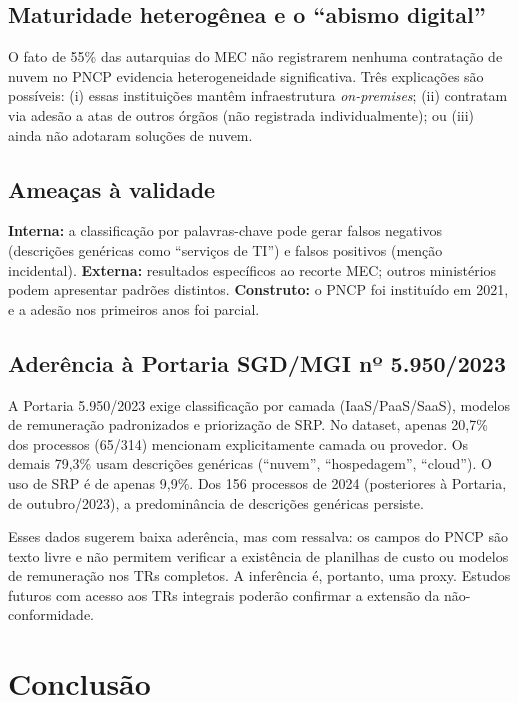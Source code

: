 \documentclass[12pt]{article}
\begin{document}
\subsection{Maturidade heterogênea e o ``abismo digital''}

O fato de 55\% das autarquias do MEC não registrarem nenhuma contratação de nuvem no PNCP evidencia heterogeneidade significativa. Três explicações são possíveis: (i) essas instituições mantêm infraestrutura \textit{on-premises}; (ii) contratam via adesão a atas de outros órgãos (não registrada individualmente); ou (iii) ainda não adotaram soluções de nuvem.

\subsection{Ameaças à validade}

\textbf{Interna:} a classificação por palavras-chave pode gerar falsos negativos (descrições genéricas como ``serviços de TI'') e falsos positivos (menção incidental). \textbf{Externa:} resultados específicos ao recorte MEC; outros ministérios podem apresentar padrões distintos. \textbf{Construto:} o PNCP foi instituído em 2021, e a adesão nos primeiros anos foi parcial.

\subsection{Aderência à Portaria SGD/MGI nº 5.950/2023}

A Portaria 5.950/2023 \cite{brasil2023portaria5950} exige classificação por camada (IaaS/PaaS/SaaS), modelos de remuneração padronizados e priorização de SRP. No dataset, apenas 20,7\% dos processos (65/314) mencionam explicitamente camada ou provedor. Os demais 79,3\% usam descrições genéricas (``nuvem'', ``hospedagem'', ``cloud''). O uso de SRP é de apenas 9,9\%. Dos 156 processos de 2024 (posteriores à Portaria, de outubro/2023), a predominância de descrições genéricas persiste.

Esses dados sugerem baixa aderência, mas com ressalva: os campos do PNCP são texto livre e não permitem verificar a existência de planilhas de custo ou modelos de remuneração nos TRs completos. A inferência é, portanto, uma proxy. Estudos futuros com acesso aos TRs integrais poderão confirmar a extensão da não-conformidade.

\section{Conclusão}
\label{sec:conclusao}
\end{document}
